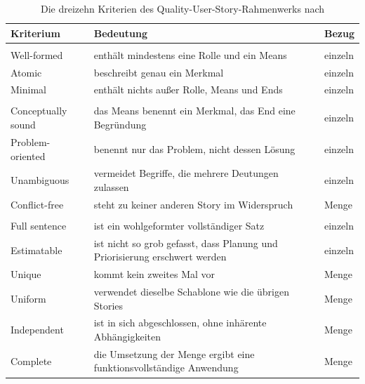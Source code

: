 \documentclass[11pt,a4paper]{report}
\begin{document}
\begin{table}[htbp]
  \centering
  \caption{Die dreizehn Kriterien des Quality-User-Story-Rahmenwerks
           nach \cite[Tab.~1]{lucassen2016qus}}
  \label{tab:qus-kriterien}
  \begin{tabular}{@{}>{\raggedright\arraybackslash}p{3.1cm}%
                    >{\raggedright\arraybackslash}p{7.5cm}%
                    >{\raggedright\arraybackslash}p{1.9cm}@{}}
    \toprule
    \textbf{Kriterium} & \textbf{Bedeutung} & \textbf{Bezug} \\
    \midrule
    \multicolumn{3}{@{}l}{\textit{Syntaktisch}} \\
    Well-formed & enthält mindestens eine Rolle und ein Means & einzeln \\
    Atomic & beschreibt genau ein Merkmal & einzeln \\
    Minimal & enthält nichts außer Rolle, Means und Ends & einzeln \\
    \midrule
    \multicolumn{3}{@{}l}{\textit{Semantisch}} \\
    Conceptually sound & das Means benennt ein Merkmal, das End eine
      Begründung & einzeln \\
    Problem-oriented & benennt nur das Problem, nicht dessen Lösung &
      einzeln \\
    Unambiguous & vermeidet Begriffe, die mehrere Deutungen zulassen &
      einzeln \\
    Conflict-free & steht zu keiner anderen Story im Widerspruch &
      Menge \\
    \midrule
    \multicolumn{3}{@{}l}{\textit{Pragmatisch}} \\
    Full sentence & ist ein wohlgeformter vollständiger Satz & einzeln \\
    Estimatable & ist nicht so grob gefasst, dass Planung und
      Priorisierung erschwert werden & einzeln \\
    Unique & kommt kein zweites Mal vor & Menge \\
    Uniform & verwendet dieselbe Schablone wie die übrigen Stories &
      Menge \\
    Independent & ist in sich abgeschlossen, ohne inhärente
      Abhängigkeiten & Menge \\
    Complete & die Umsetzung der Menge ergibt eine funktionsvollständige
      Anwendung & Menge \\
    \bottomrule
  \end{tabular}
\end{table}
\end{document}
